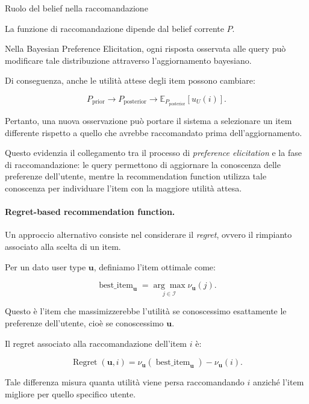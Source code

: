 \begin{observation}{Ruolo del belief nella raccomandazione}

La funzione di raccomandazione dipende dal belief corrente $P$.

Nella Bayesian Preference Elicitation, ogni risposta osservata
alle query può modificare tale distribuzione attraverso
l'aggiornamento bayesiano.

Di conseguenza, anche le utilità attese degli item possono
cambiare:

\[
P_{\text{prior}}
\longrightarrow
P_{\text{posterior}}
\longrightarrow
\mathbb E_{P_{\text{posterior}}}[u_U(i)].
\]

Pertanto, una nuova osservazione può portare il sistema
a selezionare un item differente rispetto a quello
che avrebbe raccomandato prima dell'aggiornamento.

Questo evidenzia il collegamento tra il processo
di \textit{preference elicitation} e la fase di raccomandazione:
le query permettono di aggiornare la conoscenza
delle preferenze dell'utente, mentre la recommendation
function utilizza tale conoscenza per individuare
l'item con la maggiore utilità attesa.

\end{observation}

\paragraph{Regret-based recommendation function.}

Un approccio alternativo consiste nel considerare il \textit{regret}, ovvero il rimpianto associato alla scelta di un item.

Per un dato user type $\mathbf{u}$, definiamo l'item ottimale come:

\[
\operatorname{best\_item}_{\mathbf{u}}
=
\underset{j\in\mathcal{I}}{\arg\max}
\nu_{\mathbf{u}}(j).
\]

Questo è l'item che massimizzerebbe l'utilità se conoscessimo esattamente le preferenze dell'utente, cioè se conoscessimo $\mathbf{u}$.

Il regret associato alla raccomandazione dell'item $i$ è:

\[
\operatorname{Regret}(\mathbf{u},i)
=
\nu_{\mathbf{u}}
(\operatorname{best\_item}_{\mathbf{u}})
-
\nu_{\mathbf{u}}(i).
\]

Tale differenza misura quanta utilità viene persa raccomandando $i$ anziché l'item migliore per quello specifico utente.

